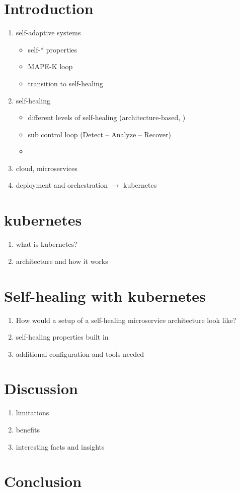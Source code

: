 
\section{Introduction}\label{sec:introduction}
  \begin{enumerate}
    \item self-adaptive systems
      \begin{itemize}
        \item self-* properties
        \item MAPE-K loop
        \item transition to self-healing
      \end{itemize}
    \item self-healing
      \begin{itemize}
        \item different levels of self-healing (architecture-based, \etc)
        \item sub control loop (Detect -- Analyze -- Recover)
        \item 
      \end{itemize}
    \item cloud, microservices
    \item deployment and orchestration $\rightarrow$ \gls{kubernetes}
  \end{enumerate}

\section[Kubernetes]{\gls{kubernetes}}
  \begin{enumerate}
    \item what is \gls{kubernetes}?
    \item architecture and how it works
  \end{enumerate}

\section{Self-healing with \gls{kubernetes}}
  \begin{enumerate}
    \item How would a setup of a self-healing microservice architecture look like?
    \item self-healing properties built in
    \item additional configuration and tools needed
  \end{enumerate}

\section{Discussion}
  \begin{enumerate}
    \item limitations
    \item benefits
    \item interesting facts and insights
  \end{enumerate}
 
 \section{Conclusion}
